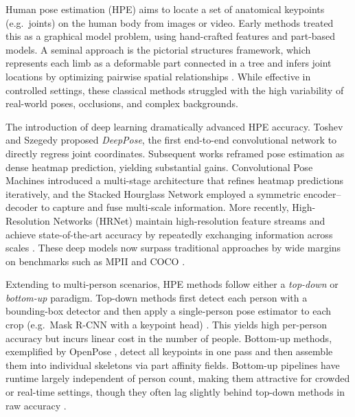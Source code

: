 Human pose estimation (HPE) aims to locate a set of anatomical keypoints (e.g.\ joints) on the human body from images or video. Early methods treated this as a graphical model problem, using hand-crafted features and part-based models. A seminal approach is the pictorial structures framework, which represents each limb as a deformable part connected in a tree and infers joint locations by optimizing pairwise spatial relationships \citep{Felzenszwalb2005}. While effective in controlled settings, these classical methods struggled with the high variability of real-world poses, occlusions, and complex backgrounds.

The introduction of deep learning dramatically advanced HPE accuracy. Toshev and Szegedy \citep{Toshev2014} proposed \emph{DeepPose}, the first end-to-end convolutional network to directly regress joint coordinates. Subsequent works reframed pose estimation as dense heatmap prediction, yielding substantial gains. Convolutional Pose Machines \citep{Wei2016} introduced a multi-stage architecture that refines heatmap predictions iteratively, and the Stacked Hourglass Network \citep{Newell2016} employed a symmetric encoder–decoder to capture and fuse multi-scale information. More recently, High-Resolution Networks (HRNet) maintain high-resolution feature streams and achieve state-of-the-art accuracy by repeatedly exchanging information across scales \citep{Sun_2019_CVPR}. These deep models now surpass traditional approaches by wide margins on benchmarks such as MPII and COCO \citep{Lan2023}.

Extending to multi-person scenarios, HPE methods follow either a \emph{top-down} or \emph{bottom-up} paradigm. Top-down methods first detect each person with a bounding-box detector and then apply a single-person pose estimator to each crop (e.g.\ Mask R-CNN with a keypoint head) \citep{He2017}. This yields high per-person accuracy but incurs linear cost in the number of people. Bottom-up methods, exemplified by OpenPose \citep{Cao_2017_CVPR}, detect all keypoints in one pass and then assemble them into individual skeletons via part affinity fields. Bottom-up pipelines have runtime largely independent of person count, making them attractive for crowded or real-time settings, though they often lag slightly behind top-down methods in raw accuracy \citep{Dubey2023PoseSurvey}.

